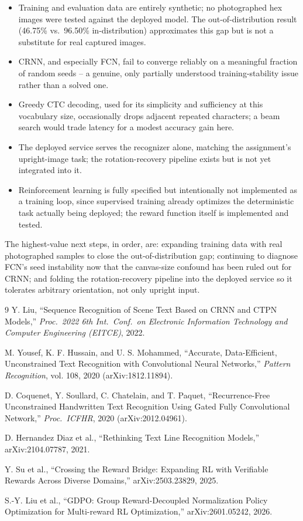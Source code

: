 \documentclass[10pt]{article}
\begin{document}
\begin{itemize}
    \item Training and evaluation data are entirely synthetic; no photographed
    hex images were tested against the deployed model. The out-of-distribution result
    (46.75\% vs.\ 96.50\% in-distribution) approximates this gap but is not a substitute
    for real captured images.
    \item CRNN, and especially FCN, fail to converge reliably on a meaningful fraction
    of random seeds -- a genuine, only partially understood training-stability issue
    rather than a solved one.
    \item Greedy CTC decoding, used for its simplicity and sufficiency at this
    vocabulary size, occasionally drops adjacent repeated characters; a beam search
    would trade latency for a modest accuracy gain here.
    \item The deployed service serves the recognizer alone, matching the assignment's
    upright-image task; the rotation-recovery pipeline exists but is not yet integrated
    into it.
    \item Reinforcement learning is fully specified but intentionally not implemented
    as a training loop, since supervised training already optimizes the deterministic
    task actually being deployed; the reward function itself is implemented and tested.
\end{itemize}

The highest-value next steps, in order, are: expanding training data with real
photographed samples to close the out-of-distribution gap; continuing to diagnose FCN's
seed instability now that the canvas-size confound has been ruled out for CRNN;
and folding the rotation-recovery pipeline into the deployed service so it tolerates
arbitrary orientation, not only upright input.

\begin{thebibliography}{9}
\small
{}
Y. Liu, ``Sequence Recognition of Scene Text Based on CRNN and CTPN Models,''
\emph{Proc.\ 2022 6th Int.\ Conf.\ on Electronic Information Technology and Computer
Engineering (EITCE)}, 2022.

M. Yousef, K. F. Hussain, and U. S. Mohammed,
``Accurate, Data-Efficient, Unconstrained Text Recognition with Convolutional Neural
Networks,'' \emph{Pattern Recognition}, vol. 108, 2020 (arXiv:1812.11894).

D. Coquenet, Y. Soullard, C. Chatelain, and T. Paquet,
``Recurrence-Free Unconstrained Handwritten Text Recognition Using Gated Fully
Convolutional Network,'' \emph{Proc.\ ICFHR}, 2020 (arXiv:2012.04961).

D. Hernandez Diaz et al.,
``Rethinking Text Line Recognition Models,'' arXiv:2104.07787, 2021.

Y. Su et al., ``Crossing the Reward Bridge: Expanding RL with Verifiable Rewards
Across Diverse Domains,'' arXiv:2503.23829, 2025.

S.-Y. Liu et al., ``GDPO: Group Reward-Decoupled Normalization Policy Optimization
for Multi-reward RL Optimization,'' arXiv:2601.05242, 2026.
\end{thebibliography}
\end{document}
